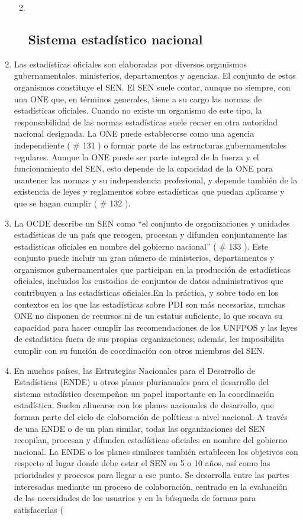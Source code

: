 \documentclass[
]{book}
\begin{document}
\begin{enumerate}
  \begin{enumerate}
  \def\labelenumii{\arabic{enumii}.}
  \item ~
    \hypertarget{sistema-estaduxedstico-nacional}{%
    \subsection{Sistema estadístico nacional}\label{sistema-estaduxedstico-nacional}}
  \end{enumerate}
\item
  Las estadísticas oficiales son elaboradas por diversos organismos gubernamentales, ministerios, departamentos y agencias. El conjunto de estos organismos constituye el SEN. El SEN suele contar, aunque no siempre, con una ONE que, en términos generales, tiene a su cargo las normas de estadísticas oficiales. Cuando no existe un organismo de este tipo, la responsabilidad de las normas estadísticas suele recaer en otra autoridad nacional designada. La ONE puede establecerse como una agencia independiente (
  \# 131
  ) o formar parte de las estructuras gubernamentales regulares. Aunque la ONE puede ser parte integral de la fuerza y el funcionamiento del SEN, esto depende de la capacidad de la ONE para mantener las normas y su independencia profesional, y depende también de la existencia de leyes y reglamentos sobre estadísticas que puedan aplicarse y que se hagan cumplir (
  \# 132
  ).
\item
  La OCDE describe un SEN como ``el conjunto de organizaciones y unidades estadísticas de un país que recogen, procesan y difunden conjuntamente las estadísticas oficiales en nombre del gobierno nacional'' (
  \# 133
  ). Este conjunto puede incluir un gran número de ministerios, departamentos y organismos gubernamentales que participan en la producción de estadísticas oficiales, incluidos los custodios de conjuntos de datos administrativos que contribuyen a las estadísticas oficiales.En la práctica, y sobre todo en los contextos en los que las estadísticas sobre PDI son más necesarias, muchas ONE no disponen de recursos ni de un estatus suficiente, lo que socava su capacidad para hacer cumplir las recomendaciones de los UNFPOS y las leyes de estadística fuera de sus propias organizaciones; además, les imposibilita cumplir con su función de coordinación con otros miembros del SEN.
\item
  En muchos países, las Estrategias Nacionales para el Desarrollo de Estadísticas (ENDE) u otros planes plurianuales para el desarrollo del sistema estadístico desempeñan un papel importante en la coordinación estadística. Suelen alinearse con los planes nacionales de desarrollo, que forman parte del ciclo de elaboración de políticas a nivel nacional. A través de una ENDE o de un plan similar, todas las organizaciones del SEN recopilan, procesan y difunden estadísticas oficiales en nombre del gobierno nacional. La ENDE o los planes similares también establecen los objetivos con respecto al lugar donde debe estar el SEN en 5 o 10 años, así como las prioridades y procesos para llegar a ese punto. Se desarrolla entre las partes interesadas mediante un proceso de colaboración, centrado en la evaluación de las necesidades de los usuarios y en la búsqueda de formas para satisfacerlas (

\end{enumerate}
\end{document}
